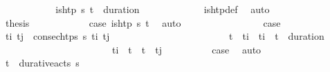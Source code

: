 \begin{isabellebody}
\ \ \ \ \ \ \ \ \isamarkupfalse%
\ \isamarkupfalse%
\ {\isachardoublequoteopen}is{\isacharunderscore}{\kern0pt}htp\ {\isasympi}s\ {\isacharparenleft}{\kern0pt}t\isactrlsub {\isasympi}\ {\isacharplus}{\kern0pt}\ duration\ {\isasympi}{\isacharparenright}{\kern0pt}{\isachardoublequoteclose}\isanewline
\ \ \ \ \ \ \ \ \ \ \isamarkupfalse%
\ is{\isacharunderscore}{\kern0pt}htp{\isacharunderscore}{\kern0pt}def\ \isamarkupfalse%
\ auto\isanewline
\ \ \ \ \ \ \ \ \isamarkupfalse%
\ \isamarkupfalse%
\ {\isacharquery}{\kern0pt}thesis\isanewline
\ \ \ \ \ \ \ \ \ \ \isamarkupfalse%
\ {\isacartoucheopen}{\isacharquery}{\kern0pt}case{}{\isacartoucheclose}\ {\isacartoucheopen}{\isasymnot}is{\isacharunderscore}{\kern0pt}htp\ {\isasympi}s\ t{\isacartoucheclose}\ \isamarkupfalse%
\ auto\isanewline
\ \ \ \ \ \ \isamarkupfalse%
\isanewline
\ \ \ \ \ \ \ \ \isamarkupfalse%
\ {\isacharquery}{\kern0pt}case{}\isanewline
\ \ \ \ \ \ \ \ \isamarkupfalse%
\ t\isactrlsub i{\isacharprime}{\kern0pt}\ t\isactrlsub j{\isacharprime}{\kern0pt}\ \ {\isachardoublequoteopen}consec{\isacharunderscore}{\kern0pt}htps\ {\isasympi}s\ t\isactrlsub i{\isacharprime}{\kern0pt}\ t\isactrlsub j{\isacharprime}{\kern0pt}{\isachardoublequoteclose}\ \isanewline
\ \ \ \ \ \ \ \ \ \ \ \ \ \ \ \ \ \ \ \ \ \ \ {\isachardoublequoteopen}t\isactrlsub {\isasympi}\ {\isasymle}\ t\isactrlsub i{\isacharprime}{\kern0pt}\ {\isasymand}\ t\isactrlsub i{\isacharprime}{\kern0pt}\ {\isacharless}{\kern0pt}\ t\isactrlsub {\isasympi}\ {\isacharplus}{\kern0pt}\ duration\ {\isasympi}{\isachardoublequoteclose}\ \isanewline
\ \ \ \ \ \ \ \ \ \ \ \ \ \ \ \ \ \ \ \ \ \ \ {\isachardoublequoteopen}t\isactrlsub i{\isacharprime}{\kern0pt}\ {\isacharless}{\kern0pt}\ t\ {\isasymand}\ t\ {\isacharless}{\kern0pt}\ t\isactrlsub j{\isacharprime}{\kern0pt}{\isachardoublequoteclose}\isanewline
\ \ \ \ \ \ \ \ \isamarkupfalse%
\ {\isacartoucheopen}{\isacharquery}{\kern0pt}case{}{\isacartoucheclose}\ \isamarkupfalse%
\ auto\isanewline
\ \ \ \ \ \ \ \ \isamarkupfalse%
\ {\isachardoublequoteopen}{\isacharparenleft}{\kern0pt}t\isactrlsub {\isasympi}{\isacharcomma}{\kern0pt}{\isasympi}{\isacharparenright}{\kern0pt}\ {\isasymin}\ durative{\isacharunderscore}{\kern0pt}acts\ {\isasympi}s{\isachardoublequoteclose}\isanewline

\end{isabellebody}
